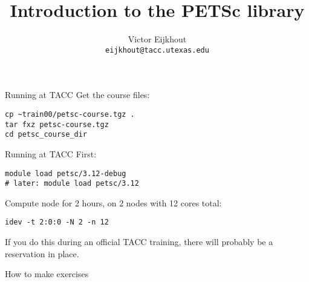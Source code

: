 \documentclass[11pt]{beamer}
\def\n{\bgroup\catcode`\_=12 \catcode`\&=12 \catcode`\$=12 
    \catcode`\<=12 \catcode`\>=12 \catcode`\~=12
    \tt \let\next=}
\begin{document}
\title{Introduction to the PETSc library}
\author{Victor Eijkhout\\
\tt\normalsize eijkhout@tacc.utexas.edu}
\date{}
\frame{\titlepage}






\begin{frame}[containsverbatim]{Running at TACC}
  Get the course files:
\begin{verbatim}
cp ~train00/petsc-course.tgz .
tar fxz petsc-course.tgz
cd petsc_course_dir
\end{verbatim}
\end{frame}

\begin{frame}[containsverbatim]{Running at TACC}
  First:
\begin{verbatim}
module load petsc/3.12-debug
# later: module load petsc/3.12
\end{verbatim}
  Compute node for 2 hours, on 2 nodes with 12 cores total:
\begin{verbatim}
idev -t 2:0:0 -N 2 -n 12
\end{verbatim}
If you do this during an official TACC training,
there will probably be a reservation in place.
\end{frame}

\begin{frame}[containsverbatim]{How to make exercises}
\end{frame}


%






\begin{longversion}
  
  
\end{longversion}


\end{document}

